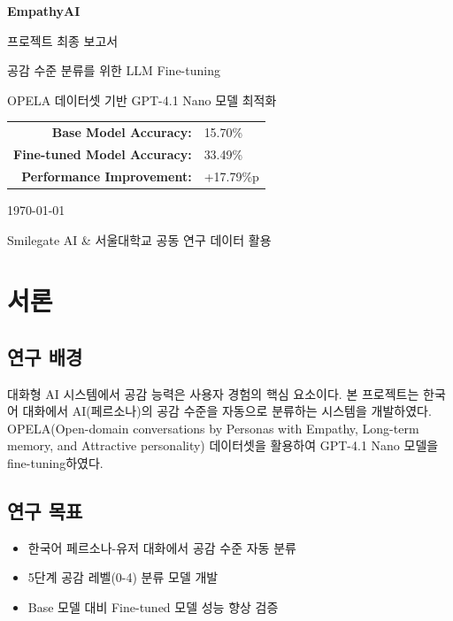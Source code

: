 \documentclass[11pt, a4paper]{article}
\begin{document}
\begin{titlepage}
    \centering
    \vspace*{2cm}
    {\Huge\bfseries\color{primary} EmpathyAI\par}
    \vspace{0.5cm}
    {\Large\color{accent} 프로젝트 최종 보고서\par}
    \vspace{2cm}
    {\large 공감 수준 분류를 위한 LLM Fine-tuning\par}
    \vspace{1cm}
    {\large OPELA 데이터셋 기반 GPT-4.1 Nano 모델 최적화\par}
    \vspace{3cm}
    
    \begin{tabular}{rl}
        \textbf{Base Model Accuracy:} & 15.70\% \\
        \textbf{Fine-tuned Model Accuracy:} & \textcolor{success}{33.49\%} \\
        \textbf{Performance Improvement:} & \textcolor{success}{+17.79\%p} \\
    \end{tabular}
    
    \vspace{3cm}
    {\large \today\par}
    \vfill
    {\normalsize Smilegate AI \& 서울대학교 공동 연구 데이터 활용\par}
\end{titlepage}

\tableofcontents
\newpage

\section{서론}

\subsection{연구 배경}
대화형 AI 시스템에서 공감 능력은 사용자 경험의 핵심 요소이다. 
본 프로젝트는 한국어 대화에서 AI(페르소나)의 공감 수준을 자동으로 분류하는 시스템을 개발하였다.
OPELA(Open-domain conversations by Personas with Empathy, Long-term memory, and Attractive personality) 
데이터셋을 활용하여 GPT-4.1 Nano 모델을 fine-tuning하였다.

\subsection{연구 목표}
\begin{itemize}
    \item 한국어 페르소나-유저 대화에서 공감 수준 자동 분류
    \item 5단계 공감 레벨(0-4) 분류 모델 개발
    \item Base 모델 대비 Fine-tuned 모델 성능 향상 검증
\end{itemize}
\end{document}
